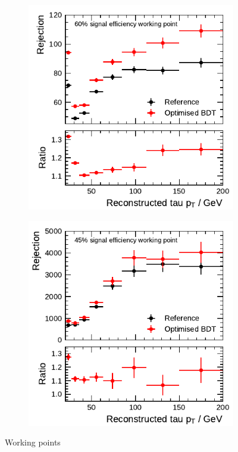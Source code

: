 \begin{figure}[ht]
  \begin{subfigure}[t]{0.48\textwidth}
    \centering
    \includegraphics{./figures/bdt_perf/post_optimisation/rejection_tight_1p.pdf}
  \end{subfigure}\hfill
  \begin{subfigure}[t]{0.48\textwidth}
    \centering
    \includegraphics{./figures/bdt_perf/post_optimisation/rejection_tight_3p.pdf}
  \end{subfigure}
  \caption{Working points}
\end{figure}



